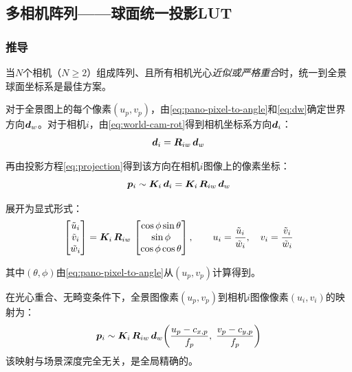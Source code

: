 \subsection{多相机阵列——球面统一投影LUT}
\label{sec:multi-rot}

\subsubsection{推导}

当$N$个相机（$N \ge 2$）组成阵列、且所有相机光心\emph{近似或严格重合}时，统一到全景球面坐标系是最佳方案。

对于全景图上的每个像素$(u_p, v_p)$，由\eqref{eq:pano-pixel-to-angle}和\eqref{eq:dw}确定世界方向$\bm{d}_w$。对于相机$i$，由\eqref{eq:world-cam-rot}得到相机坐标系方向$\bm{d}_i$：
\begin{equation}
\bm{d}_i = \bm{R}_{iw}\,\bm{d}_w
\label{eq:di-from-dw}
\end{equation}

再由投影方程\eqref{eq:projection}得到该方向在相机$i$图像上的像素坐标：
\begin{equation}
\bm{p}_i \sim \bm{K}_i\,\bm{d}_i = \bm{K}_i\,\bm{R}_{iw}\,\bm{d}_w
\label{eq:multi-rot-proj}
\end{equation}

展开为显式形式：
\begin{equation}
\begin{bmatrix}
\tilde{u}_i \\ \tilde{v}_i \\ \tilde{w}_i
\end{bmatrix}
=
\bm{K}_i\,\bm{R}_{iw}\,
\begin{bmatrix}
\cos\phi\sin\theta \\ \sin\phi \\ \cos\phi\cos\theta
\end{bmatrix},
\qquad
u_i = \frac{\tilde{u}_i}{\tilde{w}_i},\quad
v_i = \frac{\tilde{v}_i}{\tilde{w}_i}
\label{eq:multi-rot-full}
\end{equation}

其中$(\theta,\phi)$由\eqref{eq:pano-pixel-to-angle}从$(u_p, v_p)$计算得到。

\begin{theorem}[多相机纯旋转全景映射]
在光心重合、无畸变条件下，全景图像素$(u_p, v_p)$到相机$i$图像像素$(u_i, v_i)$的映射为：
\begin{equation}
\bm{p}_i \sim \bm{K}_i\,\bm{R}_{iw}\,\bm{d}_w\!\left(\frac{u_p-c_{x,p}}{f_p},\; \frac{v_p-c_{y,p}}{f_p}\right)
\label{eq:multi-rot-main}
\end{equation}
该映射与场景深度完全无关，是全局精确的。
\end{theorem}

